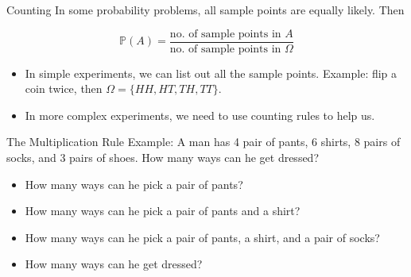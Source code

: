 \documentclass{beamer}
\newcommand{\ignore}[1]{}
\newcommand{\pr}{\mathbb{P}}
\begin{document}
\begin{frame}{Counting}
In some probability problems, all sample points are equally likely.  Then 

$$\pr(A)=\frac{\text{no. of sample points in } A}{\text{no. of sample points in } \Omega}$$

\begin{itemize}
    \item In simple experiments, we can list out all the sample points. 
        Example: flip a coin twice, then $\Omega=\{HH,HT,TH,TT\}$.
    \item In more complex experiments, we need to use counting rules to help us.
\end{itemize}
\end{frame}

\ignore{
\begin{frame}{Counting Rules}
    \begin{block}{Permutations}
    Number of different \alert{ordered} samples containing $k$ elements that can be selected from $n$ elements.
\end{block}
    \begin{itemize}
        \item Example: A club consists of five members. How many ways are there of selecting three officers: president, secretary and treasurer?
    \end{itemize}

    \vspace{\stretch{0.5}}

    \begin{block}{Combinations}
        Number of different samples of containing $k$ elements that can be selected from $n$ elements. (Order does not matter.)
    \end{block}
    \begin{itemize}
        \item Example: A club consists of five members. How many ways are there of selecting a group of three people?
    \end{itemize}
\end{frame}
}

\begin{frame}{The Multiplication Rule}
Example:  A man has 4 pair of pants, 6 shirts, 8 pairs of socks, and 3 pairs of shoes.  How many ways can he get dressed?
\begin{itemize}
\item How many ways can he pick a pair of pants?
    \item How many ways can he pick a pair of pants and a shirt?
    \item How many ways can he pick a pair of pants, a shirt, and a pair of socks?
\item How many ways can he get dressed?
\end{itemize}
\end{frame}
\end{document}
